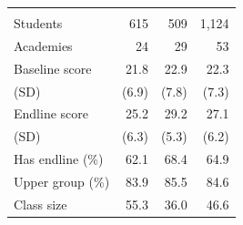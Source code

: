 \begin{table}[htbp]
\begin{tabular}{l*{3}{r}}
\addlinespace
\multicolumn{4}{l}{\textit{Grade 4}} \\
Students & 615 & 509 & 1,124 \\
Academies & 24 & 29 & 53 \\
Baseline score & 21.8 & 22.9 & 22.3 \\
\quad (SD) & (6.9) & (7.8) & (7.3) \\
Endline score & 25.2 & 29.2 & 27.1 \\
\quad (SD) & (6.3) & (5.3) & (6.2) \\
Has endline (\%) & 62.1 & 68.4 & 64.9 \\
Upper group (\%) & 83.9 & 85.5 & 84.6 \\
Class size & 55.3 & 36.0 & 46.6 \\
\bottomrule
\end{tabular}
\end{table}